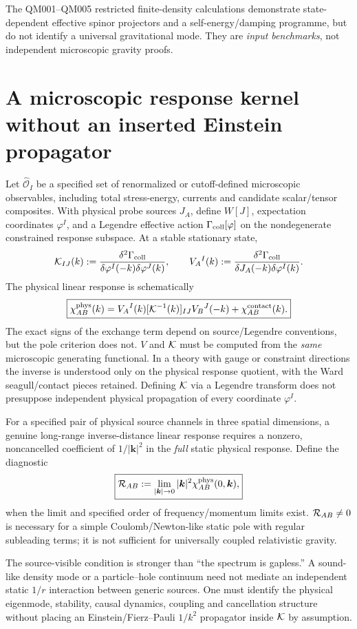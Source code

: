\documentclass[11pt,a4paper]{article}
\begin{document}
The QM001--QM005 restricted finite-density calculations demonstrate state-dependent effective spinor projectors and a self-energy/damping programme, but do not identify a universal gravitational mode. They are \emph{input benchmarks}, not independent microscopic gravity proofs.

\section{A microscopic response kernel without an inserted Einstein propagator}
Let $\widehat{\mathcal O}_I$ be a specified set of renormalized or cutoff-defined microscopic observables, including total stress-energy, currents and candidate scalar/tensor composites. With physical probe sources $J_A$, define $W[J]$, expectation coordinates $\varphi^I$, and a Legendre effective action $\Gamma_{\rm coll}[\varphi]$ on the nondegenerate constrained response subspace. At a stable stationary state,
\begin{equation}\label{eq:K}
\mathcal K_{IJ}(k):=\frac{\delta^2\Gamma_{\rm coll}}{\delta\varphi^I(-k)\delta\varphi^J(k)},\qquad V_A{}^I(k):=\frac{\delta^2\Gamma_{\rm coll}}{\delta J_A(-k)\delta\varphi^I(k)}.
\end{equation}
The physical linear response is schematically
\begin{equation}\label{eq:chi}
\boxed{\chi^{\rm phys}_{AB}(k)=V_A{}^I(k)[\mathcal K^{-1}(k)]_{IJ}V_B{}^J(-k)+\chi^{\rm contact}_{AB}(k).}
\end{equation}
The exact signs of the exchange term depend on source/Legendre conventions, but the pole criterion does not. $V$ and $\mathcal K$ must be computed from the \emph{same} microscopic generating functional. In a theory with gauge or constraint directions the inverse is understood only on the physical response quotient, with the Ward seagull/contact pieces retained. Defining $\mathcal K$ via a Legendre transform does not presuppose independent physical propagation of every coordinate $\varphi^I$.

\begin{definition}
For a specified pair of physical source channels in three spatial dimensions, a genuine long-range inverse-distance linear response requires a nonzero, noncancelled coefficient of $1/|\bm k|^2$ in the \emph{full} static physical response. Define the diagnostic
\begin{equation}\label{eq:residue}
\boxed{\mathcal R_{AB}:=\lim_{|\bm k|\to0}|\bm k|^2\chi^{\rm phys}_{AB}(0,\bm k),}
\end{equation}
when the limit and specified order of frequency/momentum limits exist. $\mathcal R_{AB}\ne0$ is necessary for a simple Coulomb/Newton-like static pole with regular subleading terms; it is not sufficient for universally coupled relativistic gravity.
\end{definition}
The source-visible condition is stronger than ``the spectrum is gapless.'' A sound-like density mode or a particle--hole continuum need not mediate an independent static $1/r$ interaction between generic sources. One must identify the physical eigenmode, stability, causal dynamics, coupling and cancellation structure without placing an Einstein/Fierz--Pauli $1/k^2$ propagator inside $\mathcal K$ by assumption.
\end{document}
